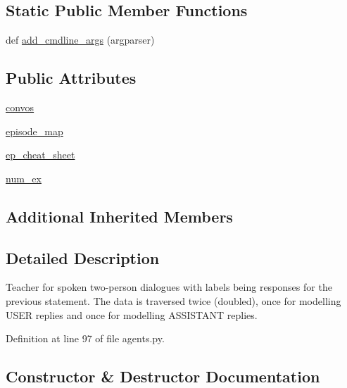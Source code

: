 \subsection*{Static Public Member Functions}
\begin{DoxyCompactItemize}
\item 
def \hyperlink{classparlai_1_1tasks_1_1taskmaster_1_1agents_1_1WozDialogueTeacher_a4af3fe28fd0b7558ddf7ed93c311c722}{add\+\_\+cmdline\+\_\+args} (argparser)
\end{DoxyCompactItemize}
\subsection*{Public Attributes}
\begin{DoxyCompactItemize}
\item 
\hyperlink{classparlai_1_1tasks_1_1taskmaster_1_1agents_1_1WozDialogueTeacher_ae7c9af4478d5e53c4467484838dfd5ba}{convos}
\item 
\hyperlink{classparlai_1_1tasks_1_1taskmaster_1_1agents_1_1WozDialogueTeacher_aa3328a99085735dacfe425013036800f}{episode\+\_\+map}
\item 
\hyperlink{classparlai_1_1tasks_1_1taskmaster_1_1agents_1_1WozDialogueTeacher_a75f5e71661e1d07f68dbfb87ba726400}{ep\+\_\+cheat\+\_\+sheet}
\item 
\hyperlink{classparlai_1_1tasks_1_1taskmaster_1_1agents_1_1WozDialogueTeacher_a27b3ee35b98d89914bc5079d8a6e75aa}{num\+\_\+ex}
\end{DoxyCompactItemize}
\subsection*{Additional Inherited Members}


\subsection{Detailed Description}
\begin{DoxyVerb}Teacher for spoken two-person dialogues with labels being responses for
the previous statement. The data is traversed twice (doubled), once for
modelling USER replies and once for modelling ASSISTANT replies.
\end{DoxyVerb}
 

Definition at line 97 of file agents.\+py.



\subsection{Constructor \& Destructor Documentation}
\mbox{\label{classparlai_1_1tasks_1_1taskmaster_1_1agents_1_1WozDialogueTeacher_a96c89da471dc6d1983e8c1c509b3be64}} 
